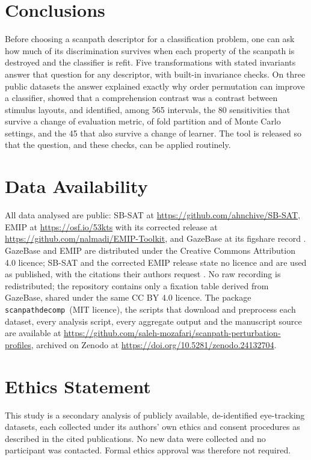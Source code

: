 \documentclass[11pt]{article}
\newcommand{\pkg}{\texttt{scanpathdecomp}}
\begin{document}
\section{Conclusions}
Before choosing a scanpath descriptor for a classification problem, one can ask how much of its discrimination survives when each property of the scanpath is destroyed and the classifier is refit. Five transformations with stated invariants answer that question for any descriptor, with built-in invariance checks. On three public datasets the answer explained exactly why order permutation can improve a classifier, showed that a comprehension contrast was a contrast between stimulus layouts, and identified, among 565 intervals, the 80 sensitivities that survive a change of evaluation metric, of fold partition and of Monte Carlo settings, and the 45 that also survive a change of learner. The tool is released so that the question, and these checks, can be applied routinely.

\section*{Data Availability}
All data analysed are public: SB-SAT at \url{https://github.com/ahnchive/SB-SAT}, EMIP at \url{https://osf.io/53kts} with its corrected release at \url{https://github.com/nalmadi/EMIP-Toolkit}, and GazeBase at its figshare record \citep{griffith2021gazebase}. GazeBase and EMIP are distributed under the Creative Commons Attribution 4.0 licence; SB-SAT and the corrected EMIP release state no licence and are used as published, with the citations their authors request \citep{ahn2020towards, almadi2021emiptoolkit}. No raw recording is redistributed; the repository contains only a fixation table derived from GazeBase, shared under the same CC BY 4.0 licence. The package \pkg\ (MIT licence), the scripts that download and preprocess each dataset, every analysis script, every aggregate output and the manuscript source are available at \url{https://github.com/saleh-mozafari/scanpath-perturbation-profiles}, archived on Zenodo at \url{https://doi.org/10.5281/zenodo.24132704}.

\section*{Ethics Statement}
This study is a secondary analysis of publicly available, de-identified eye-tracking datasets, each collected under its authors' own ethics and consent procedures as described in the cited publications. No new data were collected and no participant was contacted. Formal ethics approval was therefore not required.
\end{document}
